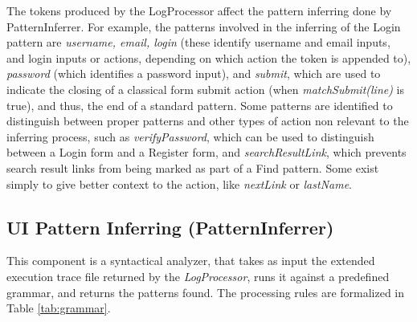 \documentclass[conference]{IEEEtran}
\begin{document}
The tokens produced by the LogProcessor affect the pattern inferring done by PatternInferrer. For example, the patterns involved in the inferring of the Login pattern are \textit{username, email, login} (these identify username and email inputs, and login inputs or actions, depending on which action the token is appended to), \textit{password} (which identifies a password input),  and \textit{submit}, which are used to indicate the closing of a classical form submit action (when \textit{matchSubmit(line)} is true), and thus, the end of a standard pattern. Some patterns are identified to distinguish between proper patterns and other types of action non relevant to the inferring process, such as \textit{verifyPassword}, which can be used to distinguish between a Login form and a Register form, and \textit{searchResultLink}, which prevents search result links from being marked as part of a Find pattern. Some exist simply to give better context to the action, like \textit{nextLink} or \textit{lastName}.\\

\subsection{UI Pattern Inferring (PatternInferrer)}\label{sec:inf}

This component is a syntactical analyzer, that takes as input the extended execution trace file returned by the \textit{LogProcessor}, runs it against a predefined grammar, and returns the patterns found. The processing rules are formalized in Table \ref{tab:grammar}.
\end{document}

